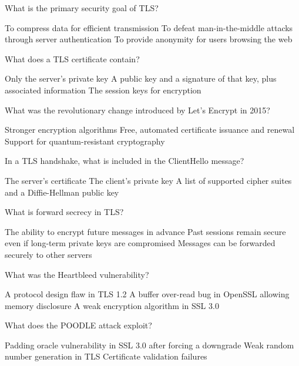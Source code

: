 \documentclass[10pt,a4paper,american]{exam}
\begin{document}
\begin{questions}
	\question What is the primary security goal of TLS?
	\begin{randomizechoices}
		\choice To compress data for efficient transmission
		\CorrectChoice To defeat man-in-the-middle attacks through server authentication
		\choice To provide anonymity for users browsing the web
	\end{randomizechoices}

	\question What does a TLS certificate contain?
	\begin{randomizechoices}
		\choice Only the server's private key
		\CorrectChoice A public key and a signature of that key, plus associated information
		\choice The session keys for encryption
	\end{randomizechoices}

	\question What was the revolutionary change introduced by Let's Encrypt in 2015?
	\begin{randomizechoices}
		\choice Stronger encryption algorithms
		\CorrectChoice Free, automated certificate issuance and renewal
		\choice Support for quantum-resistant cryptography
	\end{randomizechoices}

	\question In a TLS handshake, what is included in the ClientHello message?
	\begin{randomizechoices}
		\choice The server's certificate
		\choice The client's private key
		\CorrectChoice A list of supported cipher suites and a Diffie-Hellman public key
	\end{randomizechoices}

	\question What is forward secrecy in TLS?
	\begin{randomizechoices}
		\choice The ability to encrypt future messages in advance
		\CorrectChoice Past sessions remain secure even if long-term private keys are compromised
		\choice Messages can be forwarded securely to other servers
	\end{randomizechoices}

	\question What was the Heartbleed vulnerability?
	\begin{randomizechoices}
		\choice A protocol design flaw in TLS 1.2
		\CorrectChoice A buffer over-read bug in OpenSSL allowing memory disclosure
		\choice A weak encryption algorithm in SSL 3.0
	\end{randomizechoices}

	\question What does the POODLE attack exploit?
	\begin{randomizechoices}
		\CorrectChoice Padding oracle vulnerability in SSL 3.0 after forcing a downgrade
		\choice Weak random number generation in TLS
		\choice Certificate validation failures
	\end{randomizechoices}


\end{questions}
\end{document}
